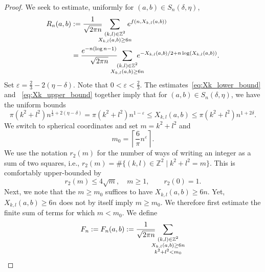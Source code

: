 \documentclass[11pt]{amsart}
\numberwithin{equation}{section}
\newcommand{\Z}{{\mathbb Z}}
\begin{document}
\begin{proof}
    We seek to estimate, uniformly for
    $(a,b)\in S_n(\delta, \eta)$,
    \begin{align}\label{eq:remainder_Janssen}
        R_n(a,b)
        &: = \frac{1}{\sqrt{2 \pi n}}
        \hspace{-8pt}
            \sum_{\substack{(k,l)\in\Z^2\\X_{k,l}(a,b)\geq6n}}
        \hspace{-8pt} 
        e^{f(n,X_{k,l}(a,b))}\\
        &=\frac{e^{-n(\log n-1)}}{\sqrt{2 \pi n}}
        \hspace{-12pt}
            \sum_{\substack{(k,l)\in\Z^2\\X_{k,l}(a,b)\geq6n}}
        \hspace{-12pt}
        e^{-X_{k,l}(a,b)/2+n\log(X_{k,l}(a,b))}.
    \end{align}
    Set $\varepsilon= \frac{2}{3} -2(\eta-\delta)$. Note that $0<\varepsilon<\frac{2}{3}.$
    The estimates~\eqref{eq:Xk_lower_bound} and ~\eqref{eq:Xk_upper_bound} together imply that for $(a,b)\in S_n(\delta, \eta)$, we have the uniform bounds
    \begin{equation}\label{eq:X_uniform_bounds}
        \pi (k^2 + l^2) n^{\frac{1}{3}+2(\eta - \delta)} = \pi (k^2 + l^2) n^{1-\varepsilon}
        \leq X_{k,l}(a,b)
        \leq \pi (k^2 + l^2) n^{1+2\delta}.
    \end{equation}
    We switch to spherical coordinates and set $m=k^2+l^2$ and    \begin{equation}\label{eq:m0_definition}
        m_0=\left\lceil\frac{6}{\pi}n^\varepsilon\right\rceil.
    \end{equation}
    We use the notation $r_2(m)$ for the number of ways of writing an integer as a sum of two squares, i.e., $r_2(m) = \#\{(k,l) \in \Z^2 \mid k^2+l^2 = m\}$. This is comfortably upper-bounded by
    \begin{equation}\label{eq:r2}
        r_2(m) \leq 4 \sqrt{m}, \quad m \geq 1,
        \qquad
        r_2(0) = 1.
    \end{equation}
    Next, we note that the $m \geq m_0$ suffices to have $X_{k,l}(a,b) \geq 6n$. Yet, $X_{k,l}(a,b) \geq 6n$ does not by itself imply $m\geq m_0$. We therefore first estimate the finite sum of terms for which $m<m_0$. We define
     \begin{equation}
        F_n := F_n(a,b) := \frac{1}{\sqrt{2 \pi n}}
        \hspace{-8pt}
            \sum_{\substack{(k,l)\in\Z^2\\X_{k,l}(a,b)\geq6n\\k^2+l^2<m_0}}

\end{equation}
\end{proof}
\end{document}
